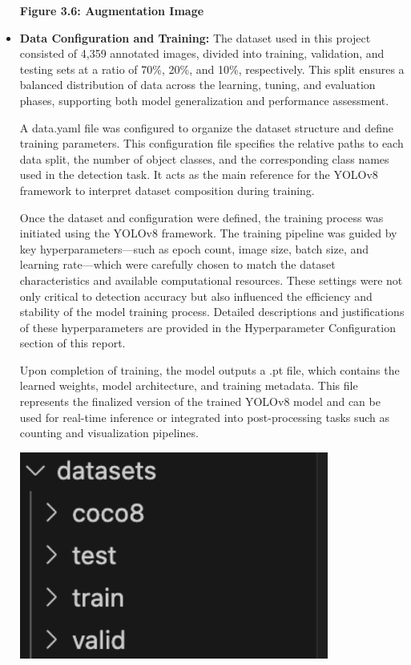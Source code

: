 \begin{itemize}
\begin{center}
		\vspace{0.5em}
		\textbf{Figure 3.6: Augmentation Image}
	\end{center}
	
	\item \textbf{Data Configuration and Training:} The dataset used in this project consisted of 4,359 annotated images, divided into training, validation, and testing sets at a ratio of 70\%, 20\%, and 10\%, respectively. This split ensures a balanced distribution of data across the learning, tuning, and evaluation phases, supporting both model generalization and performance assessment.
	
	A data.yaml file was configured to organize the dataset structure and define training parameters. This configuration file specifies the relative paths to each data split, the number of object classes, and the corresponding class names used in the detection task. It acts as the main reference for the YOLOv8 framework to interpret dataset composition during training.
	
	Once the dataset and configuration were defined, the training process was initiated using the YOLOv8 framework. The training pipeline was guided by key hyperparameters—such as epoch count, image size, batch size, and learning rate—which were carefully chosen to match the dataset characteristics and available computational resources. These settings were not only critical to detection accuracy but also influenced the efficiency and stability of the model training process. Detailed descriptions and justifications of these hyperparameters are provided in the Hyperparameter Configuration section of this report.
	
	Upon completion of training, the model outputs a .pt file, which contains the learned weights, model architecture, and training metadata. This file represents the finalized version of the trained YOLOv8 model and can be used for real-time inference or integrated into post-processing tasks such as counting and visualization pipelines.
	\begin{center}
		\includegraphics[width=0.8\textwidth]{Files.png}
		

\end{center}
\end{itemize}
